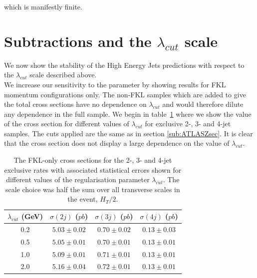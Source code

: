 		which is manifestly finite.

\section{Subtractions and the $\lambda_{cut}$ scale}
	\label{sec:indep-lambd}

	We now show the stability of the High Energy Jets predictions with respect to the
	$\lambda_{cut}$ scale described above.\\We
	increase our sensitivity to the parameter by showing results for FKL momentum
	configurations only.  The non-FKL samples which are added to give the total
	cross sections have no dependence on $\lambda_{cut}$ and would therefore dilute
	any dependence in the full sample.  We begin in table~\ref{tab:lambdaxs} where we show the value of
	the cross section for different values of $\lambda_{cut}$ for exclusive 2-, 3-
	and 4-jet samples.  The cuts applied are the same as in section \ref{sub:ATLASZsec}.
	It is clear that the cross section does not display a large dependence on the
	value of $\lambda_{cut}$.

	\begin{table}[hbt!]
		\begin{center}
		\begin{tabular}{| c | c | c | c |}
		\hline
		$\lambda_{cut}$ (GeV) & $\sigma(2j)$ ($pb$) & $\sigma(3j)$ ($pb$) & $\sigma(4j)$ ($pb$) \\ \hline
		0.2 & $5.03 \pm 0.02$ & $0.70 \pm 0.02$ & $0.13 \pm 0.03$ \\
		0.5 & $5.05 \pm 0.01$ & $0.70 \pm 0.01$ & $0.13 \pm 0.01$ \\
		1.0 & $5.09 \pm 0.01$ & $0.71 \pm 0.01$ & $0.13 \pm 0.01$ \\
		2.0 & $5.16 \pm 0.04$ & $0.72 \pm 0.01$ & $0.13 \pm 0.01$ \\ \hline
		\end{tabular}
		\caption{The FKL-only cross sections for the 2-, 3- and 4-jet exclusive rates
		with associated statistical errors shown for different values of the regularisation parameter
		$\lambda_{cut}$.  The scale choice was half the sum over all transverse scales in the event, $H_T/2$.}
		\label{tab:lambdaxs}
		\end{center}
	\end{table}

